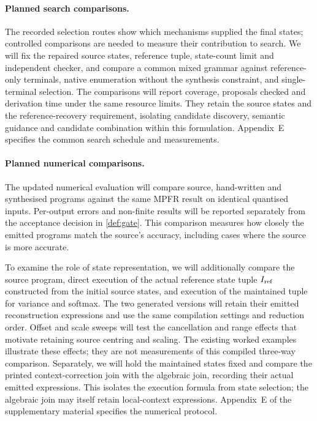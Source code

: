 \paragraph{Planned search comparisons.}
The recorded selection routes show which mechanisms supplied the final states; controlled comparisons are needed to measure their contribution to search.
We will fix the repaired source states, reference tuple, state-count limit and independent checker, and compare a common mixed grammar against reference-only terminals, native enumeration without the synthesis constraint, and single-terminal selection.
The comparisons will report coverage, proposals checked and derivation time under the same resource limits.
They retain the source states and the reference-recovery requirement, isolating candidate discovery, semantic guidance and candidate combination within this formulation.
Appendix~E specifies the common search schedule and measurements.

\paragraph{Planned numerical comparisons.}
\label{sec:eval-accuracy}

The updated numerical evaluation will compare source, hand-written and synthesised programs against the same MPFR result on identical quantised inputs.
Per-output errors and non-finite results will be reported separately from the acceptance decision in \cref{def:gate}.
This comparison measures how closely the emitted programs match the source's accuracy, including cases where the source is more accurate.

To examine the role of state representation, we will additionally compare the source program, direct execution of the actual reference state tuple $I_{\mathrm{ref}}$ constructed from the initial source states, and execution of the maintained tuple for variance and softmax.
The two generated versions will retain their emitted reconstruction expressions and use the same compilation settings and reduction order.
Offset and scale sweeps will test the cancellation and range effects that motivate retaining source centring and scaling.
The existing worked examples illustrate these effects; they are not measurements of this compiled three-way comparison.
Separately, we will hold the maintained states fixed and compare the printed context-correction join with the algebraic join, recording their actual emitted expressions.
This isolates the execution formula from state selection; the algebraic join may itself retain local-context expressions.
Appendix~E of the supplementary material specifies the numerical protocol.

